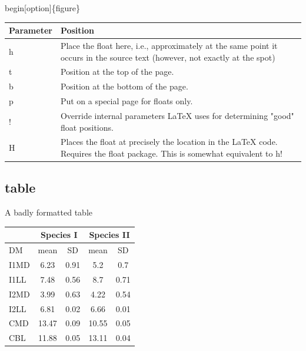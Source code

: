 \documentclass[10pt,times]{beamer}
\begin{document}
\begin{frame}[fragile]{\bs begin[option]\{figure\}}
\renewcommand{\arraystretch}{1.5}
\begin{tabularx}{\textwidth}{l X}
\toprule
\textbf{Parameter} &	\textbf{Position} \\ \midrule
h &	Place the float here, i.e., approximately at the same point it occurs in 
the source text (however, not exactly at the spot) \\
t &	Position at the top of the page. \\
b &	Position at the bottom of the page. \\
p &	Put on a special page for floats only. \\
! &	Override internal parameters LaTeX uses for determining "good" float 
positions. \\
H &	Places the float at precisely the location in the LaTeX code. Requires the 
float package. This is somewhat equivalent to h! \\ \bottomrule
\end{tabularx}
\end{frame}


\subsection{table}

\begin{frame}[fragile]{A badly formatted table}
\begin{exampletwouptinyfifty}
\begin{tabular}{|l|c|c|c|c|}
\hline 
& \multicolumn{2}{c}{Species I} &
	 \multicolumn{2}{c|}{Species II} \\ 
\hline
DM  & mean & SD  & mean & SD  \\ 
\hline 
\hline
I1MD & 6.23 & 0.91 & 5.2  & 0.7  \\
\hline 
I1LL & 7.48 & 0.56 & 8.7  & 0.71 \\
\hline 
I2MD & 3.99 & 0.63 & 4.22 & 0.54 \\
\hline 
I2LL & 6.81 & 0.02 & 6.66 & 0.01 \\
\hline 
CMD & 13.47 & 0.09 & 10.55 & 0.05 \\
\hline 
CBL & 11.88 & 0.05 & 13.11 & 0.04\\ 
\hline 
\end{tabular}
\end{exampletwouptinyfifty}
\end{frame}
\end{document}
